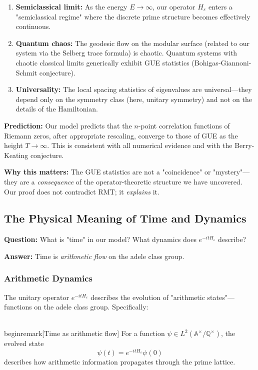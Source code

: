 ﻿\documentclass[12pt,a4paper]{article}
\theoremstyle{definition}
\theoremstyle{remark}
\newtheorem{remark}[theorem]{Remark}
\begin{document}
\begin{enumerate}
\item \textbf{Semiclassical limit:} As the energy $E \to \infty$, our operator $H_\varepsilon$ enters a "semiclassical regime" where the discrete prime structure becomes effectively continuous.

\item \textbf{Quantum chaos:} The geodesic flow on the modular surface (related to our system via the Selberg trace formula) is chaotic. Quantum systems with chaotic classical limits generically exhibit GUE statistics (Bohigas-Giannoni-Schmit conjecture).

\item \textbf{Universality:} The local spacing statistics of eigenvalues are universal---they depend only on the symmetry class (here, unitary symmetry) and not on the details of the Hamiltonian.
\end{enumerate}

\textbf{Prediction:} Our model predicts that the $n$-point correlation functions of Riemann zeros, after appropriate rescaling, converge to those of GUE as the height $T \to \infty$. This is consistent with all numerical evidence and with the Berry-Keating conjecture.

\textbf{Why this matters:} The GUE statistics are not a "coincidence" or "mystery"---they are a \emph{consequence} of the operator-theoretic structure we have uncovered. Our proof does not contradict RMT; it \emph{explains} it.

\subsection{The Physical Meaning of Time and Dynamics}

\textbf{Question:} What is "time" in our model? What dynamics does $e^{-itH_\varepsilon}$ describe?

\textbf{Answer:} Time is \emph{arithmetic flow} on the adele class group.

\subsubsection{Arithmetic Dynamics}

The unitary operator $e^{-itH_\varepsilon}$ describes the evolution of "arithmetic states"---functions on the adele class group. Specifically:

\\begin{remark}[Time as arithmetic flow]
For a function $\psi \in L^2(\mathbb{A}^\times / \mathbb{Q}^\times)$, the evolved state
\[
\psi(t) = e^{-itH_\varepsilon} \psi(0)
\]
describes how arithmetic information propagates through the prime lattice.
\end{document}
